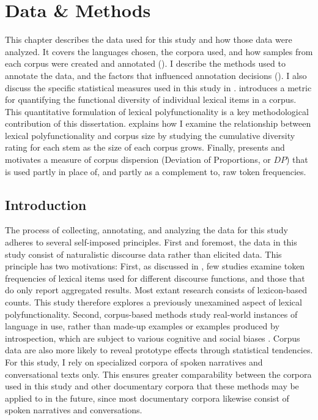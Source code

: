 \chapter{Data \& Methods}
\label{ch:methods}

This chapter describes the data used for this study and how those data were analyzed. It covers the languages chosen, the corpora used, and how samples from each corpus were created and annotated (). I describe the methods used to annotate the data, and the factors that influenced annotation decisions (). I also discuss the specific statistical measures used in this study in .  introduces a metric for quantifying the functional diversity of individual lexical items in a corpus. This quantitative formulation of lexical polyfunctionality is a key methodological contribution of this dissertation.  explains how I examine the relationship between lexical polyfunctionality and corpus size by studying the cumulative diversity rating for each stem as the size of each corpus grows. Finally,  presents and motivates a measure of corpus dispersion (Deviation of Proportions, or $DP$) that is used partly in place of, and partly as a complement to, raw token frequencies.

\section{Introduction}
\label{sec:3.1}

The process of collecting, annotating, and analyzing the data for this study adheres to several self-imposed principles. First and foremost, the data in this study consist of naturalistic discourse data rather than elicited data. This principle has two motivations: First, as discussed in , few studies examine token frequencies of lexical items used for different discourse functions, and those that do only report aggregated results. Most extant research consists of lexicon-based counts. This study therefore explores a previously unexamined aspect of lexical polyfunctionality. Second, corpus-based methods study real-world instances of language in use, rather than made-up examples or examples produced by introspection, which are subject to various cognitive and social biases \parencite[168]{Baker2018}. Corpus data are also more likely to reveal prototype effects through statistical tendencies. For this study, I rely on specialized corpora of spoken narratives and conversational texts only. This ensures greater comparability between the corpora used in this study and other documentary corpora that these methods may be applied to in the future, since most documentary corpora likewise consist of spoken narratives and conversations.

